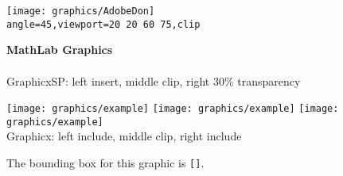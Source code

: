 \documentclass{article}
\begin{document}
\begin{center}
\texttt{[image: graphics/AdobeDon]}
\\[1ex]
\texttt{angle=45,viewport=20 20 60 75,clip}
\end{center}

\newpage

\begin{center}\ifpreview\else\previewtrue\fi
\textbf{MathLab Graphics}\\[1ex]
\\[1ex]
\textsf{GraphicxSP}: left insert, middle clip, right 30\% transparency
\end{center}

\begin{center}
\texttt{[image: graphics/example]}
\texttt{[image: graphics/example]}
\texttt{[image: graphics/example]}\\[1ex]
\textsf{Graphicx}: left include, middle clip, right include
\end{center}

The bounding box for this graphic is
\texttt{[\space{}\space{}\space{}]}.
\end{document}
